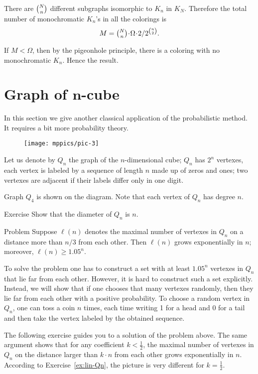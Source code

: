 There are $\tbinom Nn$ different subgraphs isomorphic to $K_n$ in $K_N$.
Therefore the total number of monochromatic $K_n$'s in all the colorings 
is 
\[M=\tbinom Nn\cdot\Omega\cdot  2/2^{\binom n2}.\]

If $M<\Omega$, then by the pigeonhole principle,
there is a coloring with no monochromatic $K_n$.
Hence the result.
\qeds

\section*{Graph of $\bm{n}$-cube}

In this section we give another classical application of the probabilistic method.
It requires a bit more probability theory. 

\begin{wrapfigure}{r}{25mm}
\vskip-0mm
\centering
\texttt{[image: mppics/pic-3]}
\vskip-0mm
\end{wrapfigure}

Let us denote by $Q_n$ the graph of the $n$-dimensional cube;
$Q_n$ has $2^n$ vertexes, each vertex is labeled by a sequence of length $n$ made up of zeros and ones;
two vertexes are adjacent if their labels differ only in one digit.

Graph $Q_4$ is shown on the diagram.
Note that each vertex of $Q_n$ has degree $n$.


\begin{thm}{Exercise}
Show that the diameter of $Q_n$ is $n$. 
\end{thm}


\begin{thm}{Problem}\label{prob:Qn}
Suppose $\ell(n)$ denotes the maximal number of vertexes in $Q_n$ on a distance more than $n/3$ from each other.
Then $\ell(n)$ grows exponentially in $n$;
moreover, $\ell(n)\ge 1.05^n$. 
\end{thm}

To solve the problem one has to construct a set with at least $1.05^n$ vertexes in $Q_n$ that lie far from each other.
However, it is hard to construct such a set explicitly.
Instead, we will show that if one chooses that many vertexes randomly, then they lie far from each other with a positive probability.
To choose a random vertex in $Q_n$, one can toss a coin $n$ times, each time writing 1 for a head and 0 for a tail and then take the vertex labeled by the obtained sequence.

The following exercise guides you to a solution of the problem above.
The same argument shows that for any coefficient $k<\tfrac12$, the maximal number of vertexes in $Q_n$ on the distance larger than $k\cdot n$ from each other grows exponentially in $n$.
According to Exercise~\ref{ex:lin-Qn}, the picture is very different for $k= \tfrac12$.

